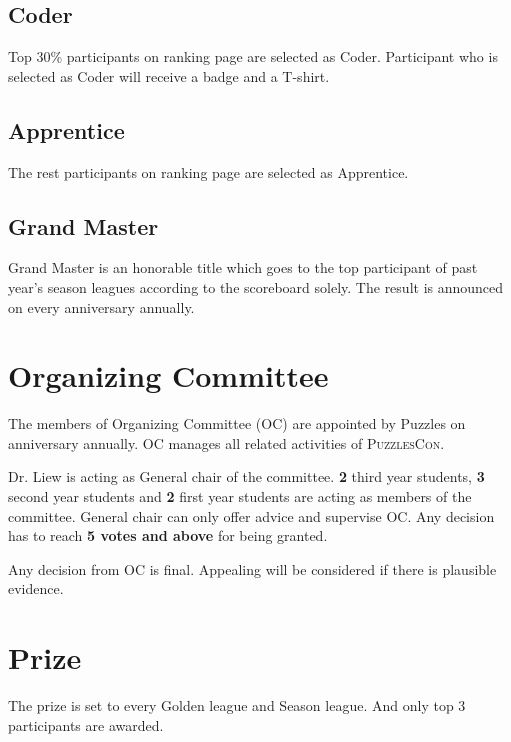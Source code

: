 \documentclass{article}
\begin{document}
\subsection{Coder}

Top 30\% participants on ranking page are selected as Coder. Participant who is selected as Coder will receive a badge and a T-shirt.

\subsection{Apprentice}

The rest participants on ranking page are selected as Apprentice.

\subsection{Grand Master}

Grand Master is an honorable title which goes to the top participant of past year's season leagues according to the scoreboard solely. The result is announced on every anniversary annually.

\section{Organizing Committee}

The members of Organizing Committee (OC) are appointed by Puzzles on anniversary annually. OC manages all related activities of \textsc{PuzzlesCon}.

Dr. Liew is acting as General chair of the committee. \textbf{2} third year students, \textbf{3} second year students and \textbf{2} first year students are acting as members of the committee. General chair can only offer advice and supervise OC. Any decision has to reach \textbf{5 votes and above} for being granted.

Any decision from OC is final. Appealing will be considered if there is plausible evidence.

\section{Prize}

The prize is set to every Golden league and Season league. And only top 3 participants are awarded.
\end{document}
